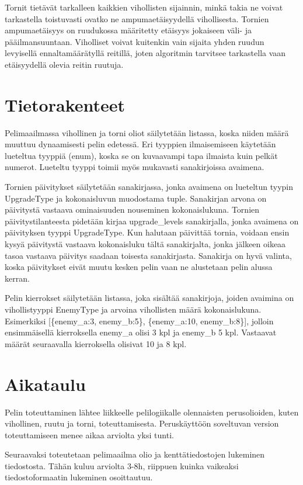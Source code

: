 \documentclass{article}
\begin{document}
Tornit tietävät tarkalleen kaikkien vihollisten sijainnin, minkä takia ne voivat tarkastella toistuvasti ovatko ne ampumaetäisyydellä vihollisesta. Tornien ampumaetäisyys on ruudukossa määritetty etäisyys jokaiseen väli- ja pää\-il\-man\-suun\-taan. Viholliset voivat kuitenkin vain sijaita yhden ruudun levyisellä ennaltamäärätyllä reitillä, joten algoritmin tarvitsee tarkastella vaan etäisyydellä olevia reitin ruutuja.

\section{Tietorakenteet}
Pelimaailmassa vihollinen ja torni oliot säilytetään listassa, koska niiden määrä muuttuu dynaamisesti pelin edetessä. Eri tyyppien ilmaisemiseen käytetään lueteltua tyyppiä (enum), koska se on kuvaavampi tapa ilmaista kuin pelkät numerot. Lueteltu tyyppi toimii myös mukavasti sanakirjoissa avaimena.

Tornien päivitykset säilytetään sanakirjassa, jonka avaimena on lueteltun tyypin UpgradeType ja kokonaisluvun muodostama tuple. Sanakirjan arvona on päivitystä vastaava ominaisuuden nouseminen kokonaislukuna. Tornien päivitystilanteesta pidetään kirjaa upgrade\_levels sanakirjalla, jonka avaimena on päivityksen tyyppi UpgradeType. Kun halutaan päivittää tornia, voidaan ensin kysyä päivitystä vastaava kokonaisluku tältä sanakirjalta, jonka jälkeen oikeaa tasoa vastaava päivitys saadaan toisesta sanakirjasta. Sanakirja on hyvä valinta, koska päivitykset eivät muutu kesken pelin vaan ne alustetaan pelin alussa kerran.

Pelin kierrokset säilytetään listassa, joka sisältää sanakirjoja, joiden avaimina on vihollistyyppi EnemyType ja arvoina vihollisten määrä kokonaislukuna. Esimerkiksi [\{enemy\_a:3, enemy\_b:5\}, \{enemy\_a:10, enemy\_b:8\}], jolloin ensimmäisellä kierroksella enemy\_a olisi 3 kpl ja enemy\_b 5 kpl. Vastaavat määrät seuraavalla kierroksella olisivat 10 ja 8 kpl.


\section{Aikataulu}
Pelin toteuttaminen lähtee liikkeelle pelilogiikalle olennaisten perusolioiden, kuten vihollinen, ruutu ja torni, toteuttamisesta. Peruskäyttöön soveltuvan version toteuttamiseen menee aikaa arviolta yksi tunti. 

Seuraavaksi toteutetaan pelimaailma olio ja kenttätiedostojen lukeminen tiedostosta. Tähän kuluu arviolta 3-8h, riippuen kuinka vaikeaksi tiedostoformaatin lukeminen osoittautuu.
\end{document}
